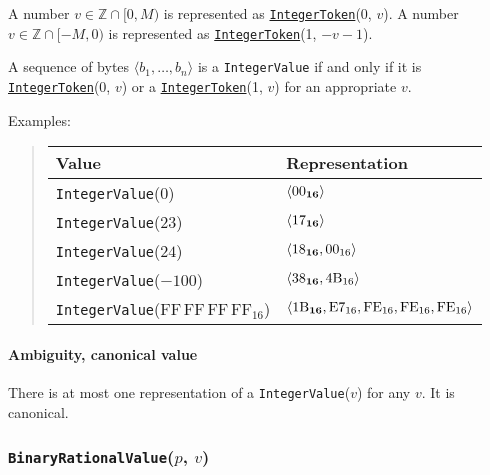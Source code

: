 \documentclass[headings=normal, headsepline, numbers=noenddot, fleqn, a4paper]{scrartcl}
\let\mathbbm\mathds
\newcommand{\SetOfIntegers}{\mathbbm{Z}}
\newcommand{\HexNumber}[1]{\mathrm{#1}_{16}}
\newcommand{\DborSyntaxIdent}[1]{\texttt{#1}}
\newcommand{\DborSyntaxIdentRef}[1]{\hyperlink{sec:def:#1}{\DborSyntaxIdent{#1}}}
\newcommand{\DborFirstByte}[2]{\mathbf{\textcolor{#1}{\HexNumber{#2}}}}
\newcommand{\DborFirstByteNumber}[1]{\DborFirstByte{black}{#1}}
\newcommand{\DborNextByte}[1]{\HexNumber{#1}}
\begin{document}
    A number $v \in \SetOfIntegers \cap [0, M)$ is represented as \DborSyntaxIdentRef{IntegerToken}(0, $v$).
    A number $v \in \SetOfIntegers \cap [-M, 0)$ is represented as \DborSyntaxIdentRef{IntegerToken}(1, $-v - 1$).

    A sequence of bytes $\langle b_1, \ldots, b_n\rangle$ is a \DborSyntaxIdent{IntegerValue} if and only if
    it is \DborSyntaxIdentRef{IntegerToken}(0, $v$) or a \DborSyntaxIdentRef{IntegerToken}(1, $v$) for an
    appropriate $v$.

    \smallskip
    \noindent
    Examples:
    \nolinebreak
    \begin{quote}    
        \begin{tabular}{ll}
            \toprule
            Value & Representation \\
            \midrule
            \DborSyntaxIdent{IntegerValue}($0$)    
                &  $\langle \DborFirstByteNumber{00} \rangle$ \\
            \DborSyntaxIdent{IntegerValue}($23$)
                &  $\langle \DborFirstByteNumber{17} \rangle$ \\
            \DborSyntaxIdent{IntegerValue}($24$)
                &  $\langle \DborFirstByteNumber{18}, \DborNextByte{00} \rangle$ \\
            \DborSyntaxIdent{IntegerValue}($-100$) 
                &  $\langle \DborFirstByteNumber{38}, \DborNextByte{4B} \rangle$ \\
            \DborSyntaxIdent{IntegerValue}($\HexNumber{FF\,FF\,FF\,FF}$) 
                &  $\langle \DborFirstByteNumber{1B}, \DborNextByte{E7}, \DborNextByte{FE},
                   \DborNextByte{FE}, \DborNextByte{FE} \rangle$ \\
            \bottomrule
        \end{tabular}
    \end{quote}

    \paragraph{Ambiguity, canonical value}

    There is at most one representation of a \DborSyntaxIdent{IntegerValue}($v$) for any $v$.
    It is canonical.


    \subsubsection{\DborSyntaxIdent{BinaryRationalValue}($p$, $v$)}
    \hypertarget{sec:def:BinaryRationalValue}{}
\end{document}
